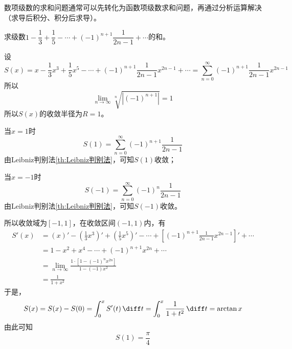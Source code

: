 数项级数的求和问题通常可以先转化为函数项级数求和问题，再通过分析运算解决（求导后积分、积分后求导）。
\begin{example}
    求级数$1 - \dfrac{1}{3} + \dfrac{1}{5} - \cdots + (-1)^{n+1}\dfrac{1}{2n-1} + \cdots$的和。
\end{example}
\begin{solution}
    设
    \[
        S(x) = x - \frac{1}{3}x^3 + \frac{1}{5}x^5 - \cdots + (-1)^{n+1}\frac{1}{2n-1}x^{2n-1} + \cdots
        =\sum_{n=0}^\infty (-1)^{n+1}\frac{1}{2n-1}x^{2n-1}
    \]
    所以
    \[  \lim_{n\to\infty} \sqrt[n]{|(-1)^{n+1}|} = 1 \]
    所以$S(x)$的收敛半径为$R=1$。

    当$x=1$时
    \[ S(1) = \sum_{n=0}^\infty (-1)^{n+1}\frac{1}{2n-1} \]
    由Leibniz判别法\ref{th:Leibniz判别法}，可知$S(1)$收敛；

    当$x=-1$时
    \[ S(-1) = \sum_{n=0}^\infty (-1)^{n}\frac{1}{2n-1} \]
    由Leibniz判别法\ref{th:Leibniz判别法}，可知$S(-1)$收敛。

    所以收敛域为$[-1,1]$，在收敛区间$(-1,1)$内，有
    \begin{align*}
        S'(x)
         & = (x)' - \left(\frac{1}{3}x^3\right)' + \left(\frac{1}{5}x^5\right)' - \cdots + \left[(-1)^{n+1}\frac{1}{2n-1}x^{2n-1}\right]' + \cdots \\
         & = 1 - x^2 + x^4 - \cdots + (-1)^{n+1}x^{2n} + \cdots                                                                                    \\
         & = \lim_{n\to\infty} \frac{1\cdot[1-(-1)^nx^{2n}]}{1-(-1)x^2}                                                                            \\
         & = \frac{1}{1+x^2}
    \end{align*}
    于是，
    \[ S(x) = S(x) - S(0)=\int_0^x S'(t)\,\diff t = \int_0^x \frac{1}{1+t^2}\,\diff t = \arctan x \]
    由此可知
    \[ S(1) = \frac{\pi}{4} \]
\end{solution}

